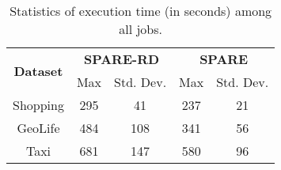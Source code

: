 \vspace{-4mm}
\begin{table}[h]
\centering \small
\begin{tabular}{|c|c|c|c|c|}
\hline
\multirow{2}{*}{\textbf{Dataset}} & \multicolumn{2}{c|}{\textbf{SPARE-RD}} & \multicolumn{2}{c|}{\textbf{SPARE}} \\ \cline{2-5} 
                         & Max        & Std. Dev.     & Max       & Std. Dev.      \\ \hline
Shopping                 & 295              & 41         & 237             & 21       \\ \hline
GeoLife                  & 484              & 108        & 341             & 56       \\ \hline
Taxi                     & 681              & 147        & 580             & 96       \\ \hline
\end{tabular}
  \caption{Statistics of execution time (in seconds) among all jobs.}
  \label{tbl:strags}
\end{table}

